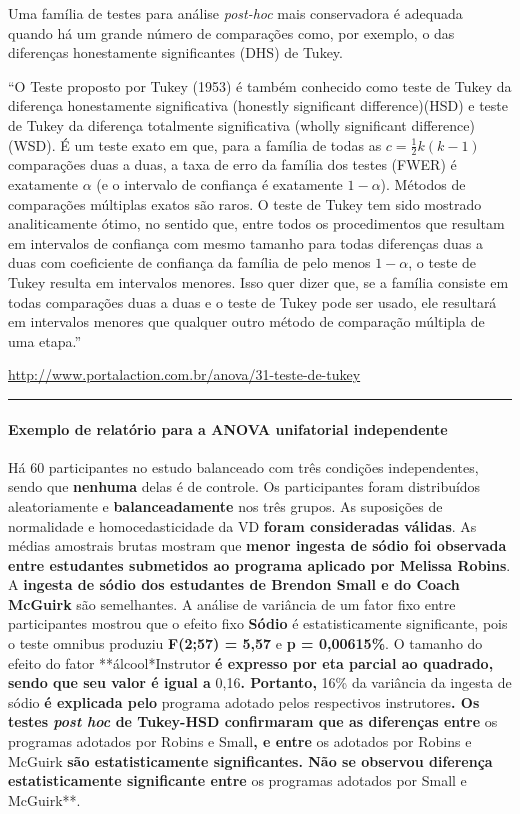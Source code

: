 \documentclass[]{article}
\let\oldparagraph\paragraph
\renewcommand{\paragraph}[1]{\oldparagraph{#1}\mbox{}}
\begin{document}
Uma família de testes para análise \emph{post-hoc} mais conservadora é
adequada quando há um grande número de comparações como, por exemplo, o
das diferenças honestamente significantes (DHS) de Tukey.

``O Teste proposto por Tukey (1953) é também conhecido como teste de
Tukey da diferença honestamente significativa (honestly significant
difference)(HSD) e teste de Tukey da diferença totalmente significativa
(wholly significant difference)(WSD). É um teste exato em que, para a
família de todas as \(c=\frac{1}{2}k(k-1)\) comparações duas a duas, a
taxa de erro da família dos testes (FWER) é exatamente \(\alpha\) (e o
intervalo de confiança é exatamente \(1-\alpha\)). Métodos de
comparações múltiplas exatos são raros. O teste de Tukey tem sido
mostrado analiticamente ótimo, no sentido que, entre todos os
procedimentos que resultam em intervalos de confiança com mesmo tamanho
para todas diferenças duas a duas com coeficiente de confiança da
família de pelo menos \(1-\alpha\), o teste de Tukey resulta em
intervalos menores. Isso quer dizer que, se a família consiste em todas
comparações duas a duas e o teste de Tukey pode ser usado, ele resultará
em intervalos menores que qualquer outro método de comparação múltipla
de uma etapa.''

\url{http://www.portalaction.com.br/anova/31-teste-de-tukey}

\begin{center}\rule{0.5\linewidth}{\linethickness}\end{center}

\paragraph{Exemplo de relatório para a ANOVA unifatorial
independente}\label{exemplo-de-relatorio-para-a-anova-unifatorial-independente}

Há 60 participantes no estudo balanceado com três condições
independentes, sendo que \textbf{nenhuma} delas é de controle. Os
participantes foram distribuídos aleatoriamente e
\textbf{balanceadamente} nos três grupos. As suposições de normalidade e
homocedasticidade da VD \textbf{foram consideradas válidas}. As médias
amostrais brutas mostram que \textbf{menor ingesta de sódio foi
observada entre estudantes submetidos ao programa aplicado por Melissa
Robins}. A \textbf{ingesta de sódio dos estudantes de Brendon Small e do
Coach McGuirk} são semelhantes. A análise de variância de um fator fixo
entre participantes mostrou que o efeito fixo \textbf{Sódio} é
estatisticamente significante, pois o teste omnibus produziu
\textbf{F(2;57) = 5,57} e \textbf{p = 0,00615\%}. O tamanho do efeito do
fator **álcool*Instrutor\textbf{ é expresso por eta parcial ao quadrado,
sendo que seu valor é igual a }0,16\textbf{. Portanto, }16\% da
variância da ingesta de sódio\textbf{ é explicada pelo }programa adotado
pelos respectivos instrutores\textbf{. Os testes \emph{post hoc} de
Tukey-HSD confirmaram que as diferenças entre }os programas adotados por
Robins e Small\textbf{, e entre }os adotados por Robins e
McGuirk\textbf{ são estatisticamente significantes. Não se observou
diferença estatisticamente significante entre }os programas adotados por
Small e McGuirk**.
\end{document}
